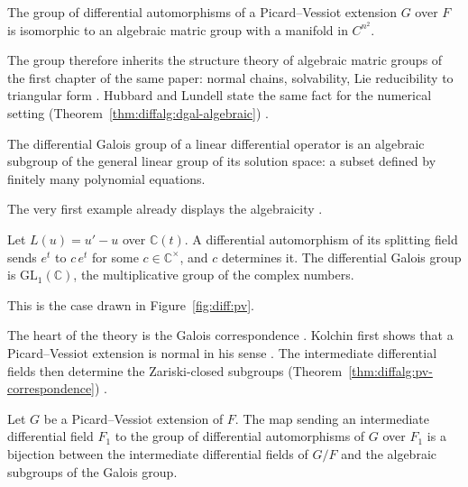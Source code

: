 \begin{theorem}\label{thm:diffalg:pv-group-algebraic}
The group of differential automorphisms of a Picard--Vessiot extension
$G$ over $F$ is isomorphic to an algebraic matric group with a manifold
in $C^{n^2}$.
\end{theorem}

The group therefore inherits the structure theory of algebraic matric
groups of the first chapter of the same paper: normal chains, solvability,
Lie reducibility to triangular form
\cite[pp.~16--24]{Kolchin1948PicardVessiot}. Hubbard and Lundell state
the same fact for the numerical setting (Theorem~\ref{thm:diffalg:dgal-algebraic})
\cite[p.~250]{HubbardLundell2011}.\begin{theorem}\label{thm:diffalg:dgal-algebraic}
The differential Galois group of a linear differential operator is an
algebraic subgroup of the general linear group of its solution space:
a subset defined by finitely many polynomial equations.
\end{theorem}

The very first example already displays the algebraicity
\cite[pp.~249--250]{HubbardLundell2011}.

\begin{example}\label{ex:diffalg:exp}
Let $L(u) = u' - u$ over $\mathbb{C}(t)$. A differential automorphism of
its splitting field sends $e^t$ to $c\,e^t$ for some
$c\in\mathbb{C}^{\times}$, and $c$ determines it. The differential Galois
group is $\mathrm{GL}_1(\mathbb{C})$, the multiplicative group of the
complex numbers.
\end{example}

This is the case drawn in Figure~\ref{fig:diff:pv}.

The heart of the theory is the Galois correspondence
\cite[pp.~29--33]{Kolchin1948PicardVessiot}. Kolchin first shows that a
Picard--Vessiot extension is normal in his sense
\cite[Theorem~1, p.~32]{Kolchin1948PicardVessiot}. The intermediate
differential fields then determine the Zariski-closed subgroups (Theorem~\ref{thm:diffalg:pv-correspondence})
\cite[Theorem, p.~32]{Kolchin1948PicardVessiot}.\begin{theorem}\label{thm:diffalg:pv-correspondence}
Let $G$ be a Picard--Vessiot extension of $F$. The map sending an
intermediate differential field $F_1$ to the group of differential
automorphisms of $G$ over $F_1$ is a bijection between the intermediate
differential fields of $G/F$ and the algebraic subgroups of the Galois
group.
\end{theorem}

